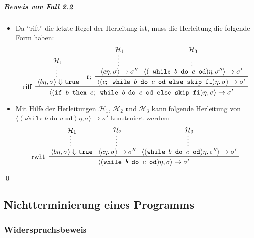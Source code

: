 					\subparagraph{Beweis von Fall 2.2}
					\begin{itemize}
						\item Da \enquote{rift} die letzte Regel der Herleitung ist, muss die Herleitung die folgende Form haben:
							\begin{equation*}
								\prftree[l]
									{ riff }
									{ \prfsummary{\mathcal{H} _ 1}{\langle b\eta, \sigma \rangle \Downarrow \texttt{true}} }
									{
										\prftree[l]
											{ r; }
											{ \prfsummary{\mathcal{H} _ 1}{\langle c\eta, \sigma \rangle \rightarrow \sigma''} }
											{ \prfsummary{\mathcal{H} _ 3}{\langle (\texttt{ while } b \texttt{ do } c \texttt{ od})\eta, \sigma'' \rangle \rightarrow \sigma' } }
											{ \langle (c ; \texttt{ while } b \texttt{ do } c \texttt{ od else skip fi}) \eta, \sigma \rangle \rightarrow \sigma' }
									}
									{ \langle (\texttt{if } b \texttt{ then } c ; \texttt{ while } b \texttt{ do } c \texttt{ od else skip fi})\eta, \sigma \rangle \rightarrow \sigma' }
							\end{equation*}
						\item Mit Hilfe der Herleitungen $ \mathcal{H} _ 1 $, $ \mathcal{H} _ 2 $ und $ \mathcal{H} _ 3 $ kann folgende Herleitung von \\ $ \langle (\texttt{while } b \texttt{ do } c \texttt{ od}) \eta, \sigma \rangle \rightarrow \sigma' $ konstruiert werden:
							\begin{equation*}
								\prftree[l]
									{ rwht }
									{ \prfsummary{\mathcal{H} _ 1}{\langle b\eta, \sigma \rangle \Downarrow \texttt{true}} }
									{ \prfsummary{\mathcal{H} _ 2}{\langle c\eta, \sigma \rangle \rightarrow \sigma''} }
									{ \prfsummary{\mathcal{H} _ 3}{\langle (\texttt{while } b \texttt{ do } c \texttt{ od}) \eta, \sigma'' \rangle \rightarrow \sigma'}  }
									{ \langle (\texttt{while } b \texttt{ do } c \texttt{ od}) \eta, \sigma \rangle \rightarrow \sigma' }
							\end{equation*}
					\end{itemize}
					
					\qed
	    
	    \subsection{Nichtterminierung eines Programms}
		    \subsubsection{Widerspruchsbeweis}
